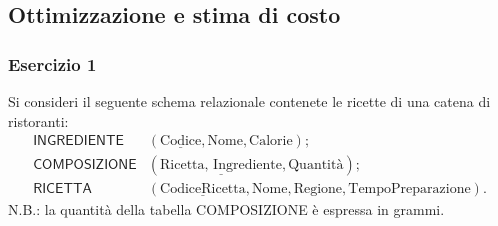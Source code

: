 \documentclass[a4paper]{article}
\begin{document}
	\subsection{Ottimizzazione e stima di costo}
	
	\subsubsection{Esercizio 1}
	
	Si consideri il seguente schema relazionale contenete le ricette di una catena di ristoranti:
	\begin{equation*}
		\begin{array}{rl}
			\textsf{INGREDIENTE} & \left(\underline{\text{Codice}}, \text{Nome}, \text{Calorie}\right); \\[0.3em]
			\textsf{COMPOSIZIONE} & \left(\underline{\text{Ricetta, Ingrediente}}, \text{Quantità}\right); \\[0.3em]
			\textsf{RICETTA} & \left(\underline{\text{CodiceRicetta}}, \text{Nome}, \text{Regione}, \text{TempoPreparazione}\right).
		\end{array}
	\end{equation*}
	N.B.: la quantità della tabella \textsf{COMPOSIZIONE} è espressa in grammi.\newline
	
\end{document}
